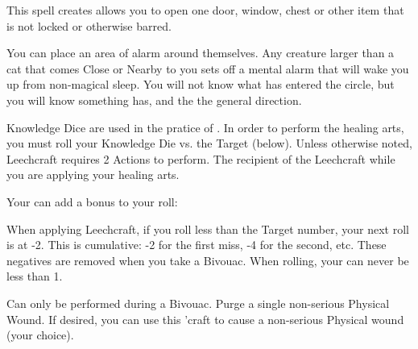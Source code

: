 {  \cbreak


  This spell creates allows you to open one door, window, chest or other item that is not locked or otherwise barred. 


  You can place an area of alarm around themselves.  Any creature larger than a cat that comes Close or Nearby to you sets off a mental alarm that will wake you up from non-magical sleep.  You will not know what has entered the circle, but you will know something has, and the the general direction.



    \newpage




    Knowledge Dice are used in the pratice of .   In order to perform the healing arts, you must roll your Knowledge Die vs. the Target (below).  Unless otherwise noted, Leechcraft requires 2 Actions to perform.  The recipient of the Leechcraft  while you are applying your healing arts.   

    Your \INT can add a bonus to your roll:


   
  When applying Leechcraft, if you roll less than the Target number, your next roll is at -2.  This is cumulative:  -2 for the first miss, -4 for the second, etc.  These negatives are removed when you take a Bivouac.  When rolling, your \SUMDICE can never be less than 1.


  \LEECHCRAFT[
    Name=Bonesetting,
    Link=leechcraft-bonesetting,
    Target=9,
    Keywords=Purge,
    Reversible=Y
  ]

  Can only be performed during a Bivouac.  Purge a single non-serious Physical Wound.  If desired, you can use this 'craft to cause a non-serious Physical wound (your choice).  

}
